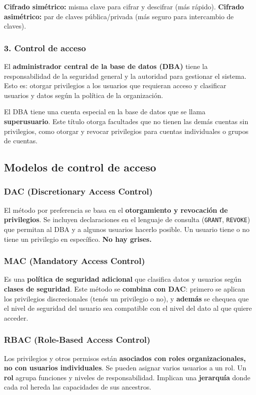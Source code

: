 \documentclass[11pt, a4paper]{article}
\begin{document}
\textbf{Cifrado simétrico:} misma clave para cifrar y descifrar (más rápido). \textbf{Cifrado asimétrico:} par de claves pública/privada (más seguro para intercambio de claves).

\subsubsection{3. Control de acceso}
El \textbf{administrador central de la base de datos (DBA)} tiene la responsabilidad de la seguridad general y la autoridad para gestionar el sistema. Esto es: otorgar privilegios a los usuarios que requieran acceso y clasificar usuarios y datos según la política de la organización.

El DBA tiene una cuenta especial en la base de datos que se llama \textbf{superusuario}. Este título otorga facultades que no tienen las demás cuentas sin privilegios, como otorgar y revocar privilegios para cuentas individuales o grupos de cuentas.

\subsection{Modelos de control de acceso}

\subsubsection{DAC (Discretionary Access Control)}
El método por preferencia se basa en el \textbf{otorgamiento y revocación de privilegios}. Se incluyen declaraciones en el lenguaje de consulta (\texttt{GRANT}, \texttt{REVOKE}) que permitan al DBA y a algunos usuarios hacerlo posible. Un usuario tiene o no tiene un privilegio en específico. \textbf{No hay grises.}

\subsubsection{MAC (Mandatory Access Control)}
Es una \textbf{política de seguridad adicional} que clasifica datos y usuarios según \textbf{clases de seguridad}. Este método se \textbf{combina con DAC}: primero se aplican los privilegios discrecionales (tenés un privilegio o no), y \textbf{además} se chequea que el nivel de seguridad del usuario sea compatible con el nivel del dato al que quiere acceder.

\subsubsection{RBAC (Role-Based Access Control)}
Los privilegios y otros permisos están \textbf{asociados con roles organizacionales, no con usuarios individuales}. Se pueden asignar varios usuarios a un rol. Un \textbf{rol} agrupa funciones y niveles de responsabilidad. Implican una \textbf{jerarquía} donde cada rol hereda las capacidades de sus ancestros.
\end{document}
